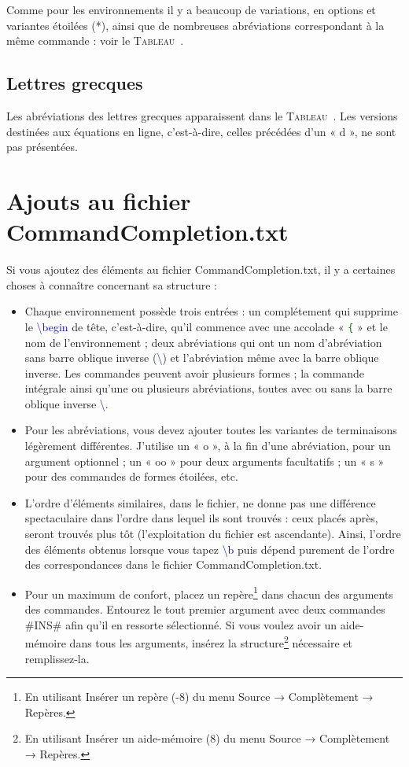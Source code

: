 \documentclass[12pt,french]{article}
\newcommand{\esc}{{\WD \symbol{82}}}
\newcommand{\ctr}{{\WD \symbol{84}}}
\newcommand{\cmd}{{\WA \symbol{122}}}
\newcommand{\fontelatex}{\ttfamily}
\newcommand{\argument}[1]{{\fontelatex#1}}
\newcommand{\com}[1]{{\fontelatex\textcolor{blue}{\textbackslash#1}}}
\begin{document}
Comme pour les environnements il y a beaucoup de variations, en options et variantes étoilées (*), ainsi que de 
nombreuses abréviations correspondant à la même commande : voir le \textsc{Tableau}~. 

\subsection*{Lettres grecques}

Les abréviations des lettres grecques apparaissent dans le \textsc{Tableau}~. Les versions destinées aux équations en ligne, c'est-à-dire, celles précédées d'un « \argument{d} », ne sont pas présentées.

\section*{Ajouts au fichier \textsf{CommandCompletion.txt}}

Si vous ajoutez des éléments au fichier \textsf{CommandCompletion.txt}, il y a certaines choses à connaître 
concernant sa structure :


\begin{itemize}
\item Chaque environnement possède trois entrées : un complétement qui supprime le \com{begin} de tête, c'est-à-dire, qu'il commence avec une accolade « \texttt{\textcolor{green}{\{}} » et le nom de l'environnement ; deux 
abréviations qui ont un nom d'abréviation sans barre oblique inverse (\com{}) et l'abréviation même avec la barre 
oblique inverse. Les commandes peuvent avoir plusieurs formes ; la commande intégrale ainsi qu'une ou plusieurs 
abréviations, toutes avec ou sans la barre oblique inverse \com{}.
\item Pour les abréviations, vous devez ajouter toutes les variantes de terminaisons légèrement différentes. J'utilise 
un « \argument{o} », à la fin d'une abréviation, pour un argument optionnel ; un « \argument{oo} » pour deux 
arguments facultatifs ; un « \argument{s} » pour des commandes de formes étoilées, etc.
\item L'ordre d'éléments similaires, dans le fichier, ne donne pas une différence spectaculaire dans l'ordre dans lequel ils sont trouvés : ceux placés après, seront trouvés plus tôt (l'exploitation du fichier est ascendante). Ainsi,  l'ordre des éléments obtenus lorsque vous tapez \com{b} puis \esc{} dépend purement de l'ordre des 
correspondances dans le fichier \textsf{CommandCompletion.txt}.
\item Pour un maximum de confort, placez un repère\footnote{En utilisant \textsf{Insérer un repère} (\cmd{}-8) du 
menu \textsf{Source} → \textsf{Complètement} → \textsf{Repères}.} dans chacun des arguments des commandes. 
Entourez le tout premier argument avec deux commandes \argument{\#INS\#} afin qu'il en ressorte sélectionné. Si 
vous voulez avoir un aide-mémoire dans tous les arguments, insérez la structure\footnote{En utilisant \textsf{Insérer un aide-mémoire} (\ctr{}\cmd{}8) du menu \textsf{Source} → \textsf{Complètement} → \textsf{Repères}.} nécessaire et remplissez-la.
\end{itemize}\smallskip
\end{document}
